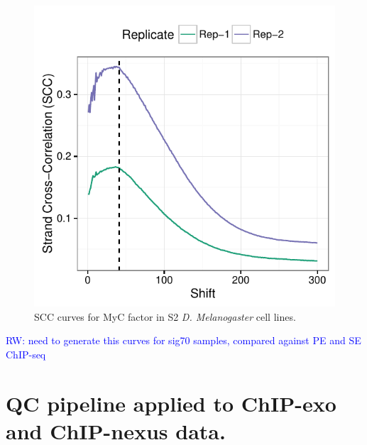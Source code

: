 \documentclass{article}
\newcommand{\RW}[1]{\textcolor{blue}{RW: #1}}
\begin{document}
\begin{figure}[H]
  \centering
  \includegraphics[width =
  .5\textwidth]{figures/supplement/SCC/Nexus_S2_MyC_SCC.pdf}
  \caption{SCC curves for MyC factor in S2 \emph{D. Melanogaster} cell
    lines.}
  \label{sfig:scc8}
\end{figure}

\RW{need to generate this curves for sig70 samples, compared against
  PE and SE ChIP-seq}

\newpage

\section{QC pipeline applied to ChIP-exo and ChIP-nexus data.}
\end{document}
